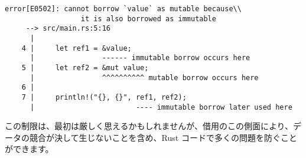 \begin{lstlisting}[numbers=none]
    error[E0502]: cannot borrow `value` as mutable because\\
                  it is also borrowed as immutable
     --> src/main.rs:5:16
      |
    4 |     let ref1 = &value;
      |                ------ immutable borrow occurs here
    5 |     let ref2 = &mut value;
      |                ^^^^^^^^^^ mutable borrow occurs here
    6 |
    7 |     println!("{}, {}", ref1, ref2);
      |                        ---- immutable borrow later used here
\end{lstlisting}

この制限は、最初は厳しく思えるかもしれませんが、借用のこの側面により、データの競合が決して生じないことを含め、Rust コードで多くの問題を防ぐことができます。


